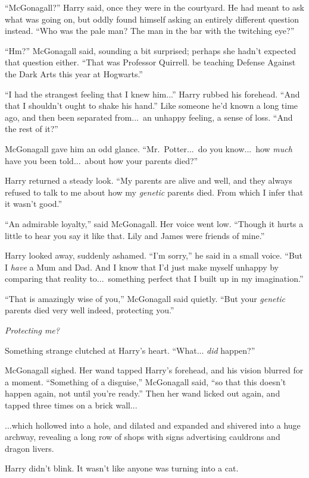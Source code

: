 “McGonagall?” Harry said, once they were in the courtyard. He had meant to ask what was going on, but oddly found himself asking an entirely different question instead. “Who was the pale man? The man in the bar with the twitching eye?”

“Hm?” McGonagall said, sounding a bit surprised; perhaps she hadn’t expected that question either. “That was Professor Quirrell.  be teaching Defense Against the Dark Arts this year at Hogwarts.”

“I had the strangest feeling that I knew him...” Harry rubbed his forehead. “And that I shouldn’t ought to shake his hand.” Like someone he’d known a long time ago, and then been separated from...\ an unhappy feeling, a sense of loss. “And the rest of it?”

McGonagall gave him an odd glance. “Mr.~Potter...\ do you know...\ how \emph{much} have you been told...\ about how your parents died?”

Harry returned a steady look. “My parents are alive and well, and they always refused to talk to me about how my \emph{genetic} parents died. From which I infer that it wasn’t good.”

“An admirable loyalty,” said McGonagall. Her voice went low. “Though it hurts a little to hear you say it like that. Lily and James were friends of mine.”

Harry looked away, suddenly ashamed. “I’m sorry,” he said in a small voice. “But I \emph{have} a Mum and Dad. And I know that I’d just make myself unhappy by comparing that reality to...\ something perfect that I built up in my imagination.”

“That is amazingly wise of you,” McGonagall said quietly. “But your \emph{genetic} parents died very well indeed, protecting you.”

\emph{Protecting me?}

Something strange clutched at Harry’s heart. “What... \emph{did} happen?”

McGonagall sighed. Her wand tapped Harry’s forehead, and his vision blurred for a moment. “Something of a disguise,” McGonagall said, “so that this doesn’t happen again, not until you’re ready.” Then her wand licked out again, and tapped three times on a brick wall...

...which hollowed into a hole, and dilated and expanded and shivered into a huge archway, revealing a long row of shops with signs advertising cauldrons and dragon livers.

Harry didn’t blink. It wasn’t like anyone was turning into a cat.

